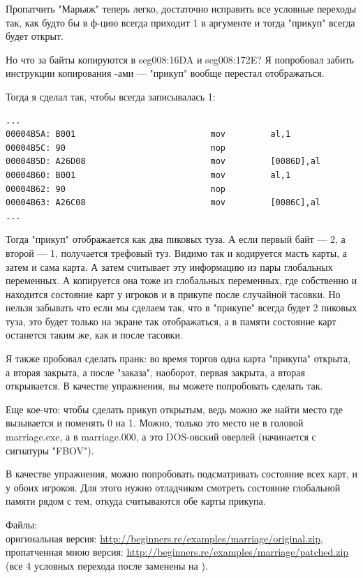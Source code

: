 Пропатчить "Марьяж" теперь легко, достаточно исправить все условные переходы так, как будто бы в ф-цию
всегда приходит 1 в аргументе и тогда "прикуп" всегда будет открыт.

Но что за байты копируются в seg008:16DA и seg008:172E?
Я попробовал забить инструкции копирования \MOV \NOP{}-ами --- "прикуп" вообще перестал отображаться.

Тогда я сделал так, чтобы всегда записывалась 1:

\begin{lstlisting}
...
00004B5A: B001                           mov         al,1
00004B5C: 90                             nop
00004B5D: A26D08                         mov         [0086D],al
00004B60: B001                           mov         al,1
00004B62: 90                             nop
00004B63: A26C08                         mov         [0086C],al
...
\end{lstlisting}

Тогда "прикуп" отображается как два пиковых туза.
А если первый байт --- 2, а второй --- 1, получается трефовый туз.
Видимо так и кодируется масть карты, а затем и сама карта.
А  затем считывает эту информацию из пары глобальных переменных.
А копируется она тоже из глобальных переменных, где собственно и находится состояние карт у игроков и в прикупе
после случайной тасовки.
Но нельзя забывать что если мы сделаем так, что в "прикупе" всегда будет 2 пиковых туза, это будет только
на экране так отображаться, а в памяти состояние карт останется таким же, как и после тасовки.

Я также пробовал сделать пранк: во время торгов одна карта "прикупа" открыта, а вторая закрыта, а после "заказа",
наоборот, первая закрыта, а вторая открывается. В качестве упражнения, вы можете попробовать сделать так.

Еще кое-что: чтобы сделать прикуп открытым, ведь можно же найти место где вызывается  и поменять 0
на 1. Можно, только это место не в головой marriage.exe, а в marriage.000, а это DOS-овский оверлей (начинается
с сигнатуры "FBOV").

В качестве упражнения, можно попробовать подсматривать состояние всех карт, и у обоих игроков.
Для этого нужно отладчиком смотреть состояние глобальной памяти рядом с тем, откуда считываются обе карты
прикупа.

Файлы: \\
оригинальная версия: \url{http://beginners.re/examples/marriage/original.zip}, \\
пропатченная мною версия: \url{http://beginners.re/examples/marriage/patched.zip} 
(все 4 условных перехода после  заменены на \JMP).

